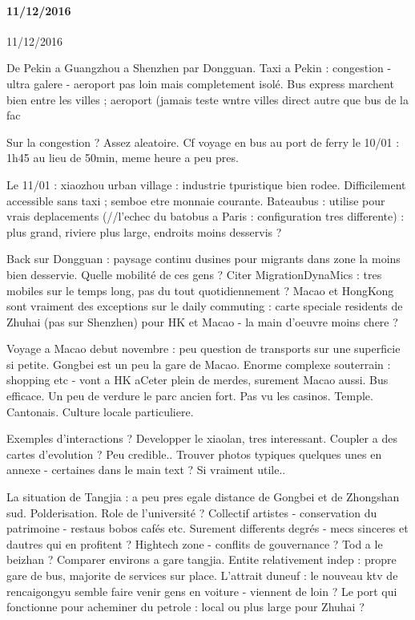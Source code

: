 \paragraph{11/12/2016}{11/12/2016}


De Pekin a Guangzhou a Shenzhen par Dongguan. Taxi a Pekin : congestion - ultra galere - aeroport pas loin mais completement isolé. Bus express marchent bien entre les villes ; aeroport (jamais teste wntre villes direct autre que bus de la fac

Sur la congestion ? Assez aleatoire. Cf voyage en bus au port de ferry le 10/01 : 1h45 au lieu de 50min, meme heure a peu pres.

Le 11/01 : xiaozhou urban village : industrie tpuristique bien rodee. Difficilement accessible sans taxi ; semboe etre monnaie courante. Bateaubus : utilise pour vrais deplacements (//l'echec du batobus a Paris : configuration tres differente) : plus grand, riviere plus large, endroits moins desservis ?

Back sur Dongguan : paysage continu dusines pour migrants dans zone la moins bien desservie. Quelle mobilité de ces gens ? Citer MigrationDynaMics : tres mobiles sur le temps long, pas du tout quotidiennement ? Macao et HongKong sont vraiment des exceptions sur le daily commuting : carte speciale residents de Zhuhai (pas sur Shenzhen) pour HK et Macao - la main d'oeuvre moins chere ?

Voyage a Macao debut novembre : peu question de transports sur une superficie si petite. Gongbei est un peu la gare de Macao. Enorme complexe souterrain : shopping etc - vont a HK aCeter plein de merdes, surement Macao aussi. Bus efficace. Un peu de verdure le parc ancien fort. Pas vu les casinos. Temple. Cantonais. Culture locale particuliere.

Exemples d'interactions ? Developper le xiaolan, tres interessant. Coupler a des cartes d'evolution ? Peu credible..
Trouver photos typiques quelques unes en annexe - certaines dans le main text ? Si vraiment utile..

La situation de Tangjia : a peu pres egale distance de Gongbei et de Zhongshan sud. Polderisation. Role de l'université ? Collectif artistes - conservation du patrimoine - restaus bobos cafés etc. Surement differents degrés - mecs sinceres et dautres qui en profitent ? Hightech zone - conflits de gouvernance ? Tod a le beizhan ? Comparer environs a gare tangjia. Entite relativement indep : propre gare de bus, majorite de services sur place. L'attrait duneuf : le nouveau ktv de rencaigongyu semble faire venir gens en voiture - viennent de loin ?
Le port qui fonctionne pour acheminer du petrole : local ou plus large pour Zhuhai ?

